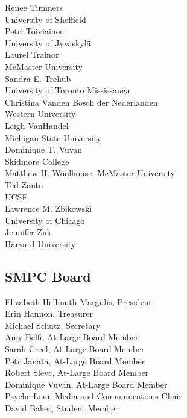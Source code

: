 \begin{multicols}{2}
Renee Timmers\\
\vspace{.5em}University of Sheffield\\
Petri Toiviainen\\
\vspace{.5em}University of Jyv{\"a}skyl{\"a}\\
Laurel Trainor\\
\vspace{.5em}McMaster University\\
Sandra E. Trehub\\
\vspace{.5em}University of Toronto Mississauga\\
Christina Vanden Bosch der Nederlanden\\
\vspace{.5em}Western University\\
Leigh VanHandel\\
\vspace{.5em}Michigan State University\\
Dominique T. Vuvan\\
\vspace{.5em}Skidmore College\\
Matthew H. Woolhouse, McMaster University\\
Ted Zanto\\
\vspace{.5em}UCSF\\
Lawrence M. Zbikowski\\
\vspace{.5em}University of Chicago\\
Jennifer Zuk\\
\vspace{.5em}Harvard University

\subsection*{SMPC Board}
Elizabeth Hellmuth Margulis, President\\
Erin Hannon, Treasurer\\
Michael Schutz, Secretary\\
Amy Belfi, At-Large Board Member\\
Sarah Creel, At-Large Board Member\\
Petr Janata, At-Large Board Member\\
Robert Slevc, At-Large Board Member\\
Dominique Vuvan, At-Large Board Member\\
Psyche Loui, Media and Communications Chair\\
David Baker, Student Member


\end{multicols}
